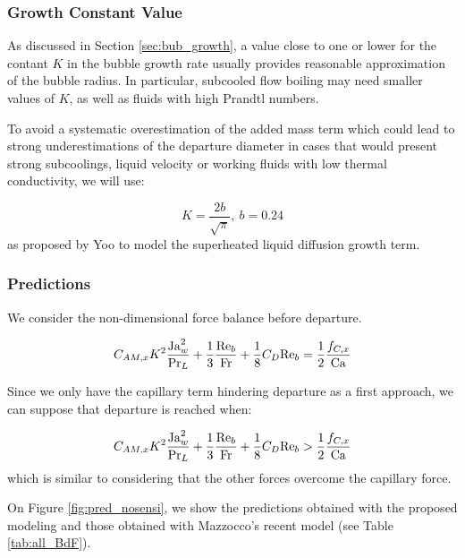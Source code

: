 \subsubsection{Growth Constant Value}

As discussed in Section \ref{sec:bub_growth}, a value close to one or lower for the contant $K$ in the bubble growth rate usually provides reasonable approximation of the bubble radius. In particular, subcooled flow boiling may need smaller values of $K$, as well as fluids with high Prandtl numbers. 

\npar

To avoid a systematic overestimation of the added mass term which could lead to strong underestimations of the departure diameter in cases that would present strong subcoolings, liquid velocity or working fluids with low thermal conductivity, we will use:

\begin{equation}
K=\frac{2b}{\sqrt{\pi}},\ b=0.24
\end{equation}
as proposed by Yoo \etal \cite{yoo_development_2018} to model the superheated liquid diffusion growth term.


\subsubsection{Predictions}

We consider the non-dimensional force balance before departure.

\begin{equation}
C_{AM,x}K^{2} \frac{\mathrm{Ja}_{w}^{2}}{\mathrm{Pr}_{L}} + \frac{1}{3}\frac{\mathrm{Re}_{b}}{\mathrm{Fr}} + \frac{1}{8}C_{D}\mathrm{Re}_{b} = \frac{1}{2} \frac{f_{C,x}}{\mathrm{Ca}}
\end{equation}

Since we only have the capillary term hindering departure as a first approach, we can suppose that departure is reached when:

\begin{equation}
C_{AM,x}K^{2} \frac{\mathrm{Ja}_{w}^{2}}{\mathrm{Pr}_{L}} + \frac{1}{3}\frac{\mathrm{Re}_{b}}{\mathrm{Fr}} + \frac{1}{8}C_{D}\mathrm{Re}_{b} > \frac{1}{2} \frac{f_{C,x}}{\mathrm{Ca}}
\label{eq:pred_nogr}
\end{equation}
which is similar to considering that the other forces overcome the capillary force.


\npar
On Figure \ref{fig:pred_nosensi}, we show the predictions obtained with the proposed modeling and those obtained with Mazzocco's recent model \cite{mazzocco_reassessed_2018} (see Table \ref{tab:all_BdF}). 


